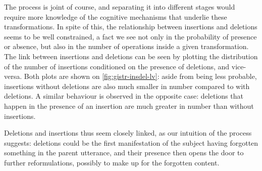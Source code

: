 \documentclass[a4paper,fleqn]{cas-dc}
\begin{document}
The process is joint of course, and separating it into different stages
would require more knowledge of the cognitive mechanisms that underlie
these transformations. In spite of this, the relationship between
insertions and deletions seems to be well constrained, a fact we see not
only in the probability of presence or absence, but also in the number
of operations inside a given transformation. The link between insertions
and deletions can be seen by plotting the distribution of the number of
insertions conditioned on the presence of deletions, and vice-versa.
Both plots are shown on \cref{fig:gistr-insdel-lv}: aside from being
less probable, insertions without deletions are also much smaller in
number compared to with deletions. A similar behaviour is observed in
the opposite case: deletions that happen in the presence of an insertion
are much greater in number than without insertions.

Deletions and insertions thus seem closely linked, as our intuition of
the process suggests: deletions could be the first manifestation of the
subject having forgotten something in the parent utterance, and their
presence then opens the door to further reformulations, possibly to make
up for the forgotten content.
\end{document}
